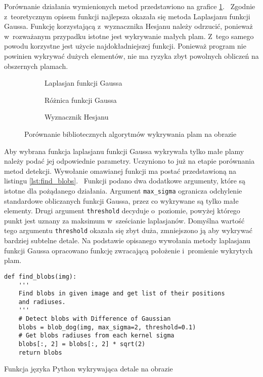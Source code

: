 Porównanie działania wymienionych metod przedstawiono na grafice
\ref{fig:blob_compare}.~%
Zgodnie z~teoretycznym opisem funkcji najlepsza okazała się metoda Laplasjanu
funkcji Gaussa.
Funkcję korzystającą z~wyznacznika Hesjanu należy odrzucić, ponieważ
w~rozważanym przypadku istotne jest wykrywanie małych plam.
Z~tego samego powodu korzystne jest użycie najdokładniejszej funkcji.
Ponieważ program nie powinien wykrywać dużych elementów, nie ma ryzyka zbyt
powolnych obliczeń na obszernych plamach.
\begin{figure}[h]
    \hspace*{\fill}
    \begin{subfigure}[t]{0.3\textwidth}
        \centering
        
        \caption{Laplasjan funkcji Gaussa}
    \end{subfigure}
    \hfill
    \begin{subfigure}[t]{0.3\textwidth}
        \centering
        
        \caption{Różnica funkcji Gaussa}
    \end{subfigure}
    \hfill
    \begin{subfigure}[t]{0.3\textwidth}
        \centering
        
        \caption{Wyznacznik Hesjanu}
    \end{subfigure}
    \hspace*{\fill}
    \caption{Porównanie bibliotecznych algorytmów wykrywania plam na obrazie}
    \label{fig:blob_compare}
\end{figure}

Aby wybrana funkcja laplasjanu funkcji Gaussa wykrywała tylko małe plamy należy
podać jej odpowiednie parametry.
Uczyniono to już na etapie porównania metod detekcji.
Wywołanie omawianej funkcji ma postać przedstawioną na listingu
\ref{lst:find_blobs}.~%
Funkcji podano dwa dodatkowe argumenty, które są istotne dla pożądanego
działania.
Argument \texttt{max_sigma} ogranicza odchylenie standardowe
obliczanych funkcji Gaussa, przez co wykrywane są tylko małe elementy.
Drugi argument \texttt{threshold} decyduje o~poziomie, powyżej
którego punkt jest uznany za maksimum w~sześcianie laplasjanów.
Domyślna wartość tego argumentu \texttt{threshold} okazała się zbyt
duża, zmniejszono ją aby wykrywać bardziej subtelne detale.
Na podstawie opisanego wywołania metody laplasjanu funkcji Gaussa opracowano
funkcję zwracającą położenie i~promienie wykrytych plam.
\begin{listing}[htb]
\begin{verbatim}
def find_blobs(img):
    '''
    Find blobs in given image and get list of their positions
    and radiuses.
    '''
    # Detect blobs with Difference of Gaussian
    blobs = blob_dog(img, max_sigma=2, threshold=0.1)
    # Get blobs radiuses from each kernel sigma
    blobs[:, 2] = blobs[:, 2] * sqrt(2)
    return blobs
\end{verbatim}
\caption{Funkcja języka Python wykrywająca detale na obrazie}
\label{lst:find_blobs}
\end{listing}

